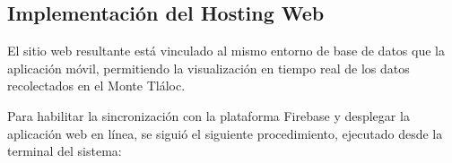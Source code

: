 






\subsection{Implementación del Hosting Web}



El sitio web resultante está vinculado al mismo entorno de base de datos que la aplicación móvil, permitiendo la visualización en tiempo real de los datos recolectados en el Monte Tláloc.


Para habilitar la sincronización con la plataforma Firebase y desplegar la aplicación web en línea, se siguió el siguiente procedimiento, ejecutado desde la terminal del sistema:

